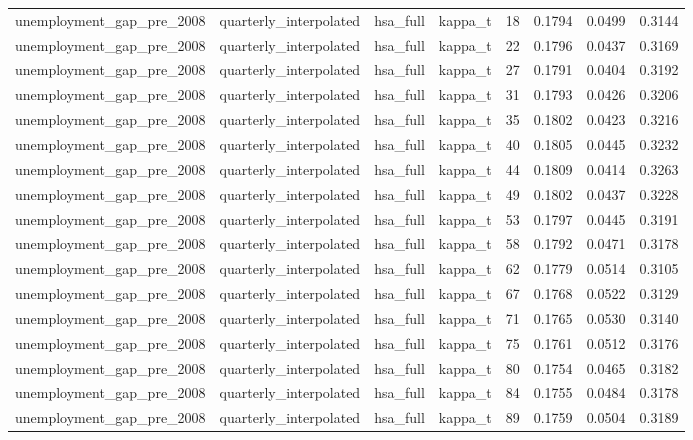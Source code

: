 \begin{tabular}{llllrrrr}
unemployment\_gap\_pre\_2008 & quarterly\_interpolated & hsa\_full & kappa\_t & 18 & 0.1794 & 0.0499 & 0.3144 \\
unemployment\_gap\_pre\_2008 & quarterly\_interpolated & hsa\_full & kappa\_t & 22 & 0.1796 & 0.0437 & 0.3169 \\
unemployment\_gap\_pre\_2008 & quarterly\_interpolated & hsa\_full & kappa\_t & 27 & 0.1791 & 0.0404 & 0.3192 \\
unemployment\_gap\_pre\_2008 & quarterly\_interpolated & hsa\_full & kappa\_t & 31 & 0.1793 & 0.0426 & 0.3206 \\
unemployment\_gap\_pre\_2008 & quarterly\_interpolated & hsa\_full & kappa\_t & 35 & 0.1802 & 0.0423 & 0.3216 \\
unemployment\_gap\_pre\_2008 & quarterly\_interpolated & hsa\_full & kappa\_t & 40 & 0.1805 & 0.0445 & 0.3232 \\
unemployment\_gap\_pre\_2008 & quarterly\_interpolated & hsa\_full & kappa\_t & 44 & 0.1809 & 0.0414 & 0.3263 \\
unemployment\_gap\_pre\_2008 & quarterly\_interpolated & hsa\_full & kappa\_t & 49 & 0.1802 & 0.0437 & 0.3228 \\
unemployment\_gap\_pre\_2008 & quarterly\_interpolated & hsa\_full & kappa\_t & 53 & 0.1797 & 0.0445 & 0.3191 \\
unemployment\_gap\_pre\_2008 & quarterly\_interpolated & hsa\_full & kappa\_t & 58 & 0.1792 & 0.0471 & 0.3178 \\
unemployment\_gap\_pre\_2008 & quarterly\_interpolated & hsa\_full & kappa\_t & 62 & 0.1779 & 0.0514 & 0.3105 \\
unemployment\_gap\_pre\_2008 & quarterly\_interpolated & hsa\_full & kappa\_t & 67 & 0.1768 & 0.0522 & 0.3129 \\
unemployment\_gap\_pre\_2008 & quarterly\_interpolated & hsa\_full & kappa\_t & 71 & 0.1765 & 0.0530 & 0.3140 \\
unemployment\_gap\_pre\_2008 & quarterly\_interpolated & hsa\_full & kappa\_t & 75 & 0.1761 & 0.0512 & 0.3176 \\
unemployment\_gap\_pre\_2008 & quarterly\_interpolated & hsa\_full & kappa\_t & 80 & 0.1754 & 0.0465 & 0.3182 \\
unemployment\_gap\_pre\_2008 & quarterly\_interpolated & hsa\_full & kappa\_t & 84 & 0.1755 & 0.0484 & 0.3178 \\
unemployment\_gap\_pre\_2008 & quarterly\_interpolated & hsa\_full & kappa\_t & 89 & 0.1759 & 0.0504 & 0.3189 \\

\end{tabular}
